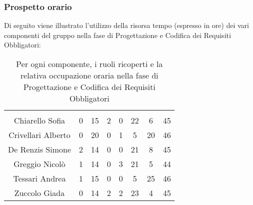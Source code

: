 \subsubsection{Prospetto orario}
Di seguito viene illustrato l'utilizzo della risorsa tempo (espresso in ore) dei vari componenti del gruppo nella fase di Progettazione e Codifica dei Requisiti Obbligatori:

\begin{table}[H]
	\begin{center}
		\begin{tabular}{c
				!{\color[HTML]{9b240a}\vrule width 1pt}
				cccccc
				!{\color[HTML]{9b240a}\vrule width 1pt}	
				c}
			\rowcolorhead
			 &  &  &  &  &  &  &  \\
			
			Chiarello Sofia & 0 & 15 & 2 & 0 & 22 & 6 & 45\\
			Crivellari Alberto & 0 & 20 & 0 & 1 & 5 & 20 & 46\\
			De Renzis Simone & 2 & 14 & 0 & 0 & 21 & 8 & 45\\
			Greggio Nicolò & 1 & 14 & 0 & 3 & 21 & 5 & 44\\
			Tessari Andrea & 1 & 15 & 0 & 0 & 5 & 25 & 46\\
			Zuccolo Giada & 0 & 14 & 2 & 2 & 23 & 4 & 45\\
		\end{tabular}
		\caption[Occupazione oraria Progettazione e Codifica dei Requisiti Obbligatori]{Per ogni componente, i ruoli ricoperti e la relativa occupazione oraria nella fase di Progettazione e Codifica dei Requisiti Obbligatori}
	\end{center}
\end{table}


